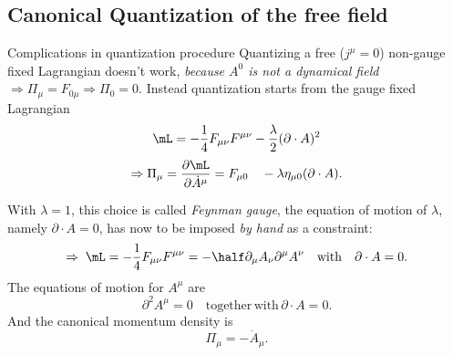 \subsection{Canonical Quantization of the free field}
\begin{mybox}{Complications in quantization procedure}
	Quantizing a free ($j^{\mu}=0$) non-gauge fixed Lagrangian doesn't work, \emph{because $A^0$ is not a dynamical field} $\Rightarrow \Pi_{\mu}=F_{0\mu} \Rightarrow \Pi_0=0$. Instead quantization starts from the gauge fixed Lagrangian
	\begin{equation}
		\mL = - \frac{1}{4} F_{\mu \nu} F^{\mu \nu} - \frac{\lambda}{2} (\partial \cdot A)^2
	\end{equation}
	\begin{equation}
		\Rightarrow \Pi_{\mu} = \frac{\partial \mL}{\partial \dot{A}^{\mu}} = F_{\mu 0} \quad - \lambda \eta_{\mu 0} (\partial \cdot A).
	\end{equation}
\end{mybox}
With $\lambda=1$, this choice is called \emph{Feynman gauge}, the equation of motion of $\lambda$, namely $\partial \cdot A=0$, has now to be imposed \emph{by hand} as a constraint:
\begin{equation}
	\Rightarrow  \; \mL = -\frac{1}{4} F_{\mu \nu} F^{\mu \nu} = - \half \partial_{\mu}A_{\nu}\partial^{\mu} A^{\nu} \quad \mathrm{with} \quad \partial \cdot A =0.
\end{equation}
The equations of motion for $A^{\mu}$ are 
\begin{equation}
	\partial^2 A^{\mu} =0 \quad \mathrm{together\, with\, } \partial \cdot A=0.
\end{equation}
And the canonical momentum density is
\begin{equation}
	\Pi_{\mu} = - \dot{A}_{\mu}.
\end{equation}
